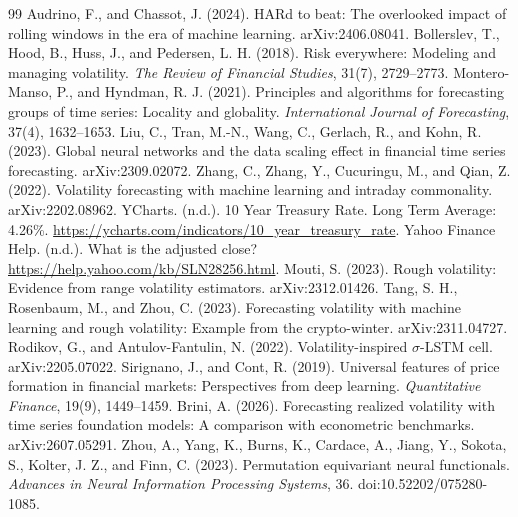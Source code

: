 \documentclass[12pt,a4paper]{article}
\numberwithin{equation}{section}
\numberwithin{table}{section}
\numberwithin{figure}{section}
\begin{document}
\begin{thebibliography}{99}
 Audrino, F., and Chassot, J. (2024). HARd to beat: The overlooked impact of rolling windows in the era of machine learning. arXiv:2406.08041.
 Bollerslev, T., Hood, B., Huss, J., and Pedersen, L. H. (2018). Risk everywhere: Modeling and managing volatility. \emph{The Review of Financial Studies}, 31(7), 2729--2773.
 Montero-Manso, P., and Hyndman, R. J. (2021). Principles and algorithms for forecasting groups of time series: Locality and globality. \emph{International Journal of Forecasting}, 37(4), 1632--1653.
 Liu, C., Tran, M.-N., Wang, C., Gerlach, R., and Kohn, R. (2023). Global neural networks and the data scaling effect in financial time series forecasting. arXiv:2309.02072.
 Zhang, C., Zhang, Y., Cucuringu, M., and Qian, Z. (2022). Volatility forecasting with machine learning and intraday commonality. arXiv:2202.08962.
 YCharts. (n.d.). 10 Year Treasury Rate. Long Term Average: 4.26\%. \url{https://ycharts.com/indicators/10_year_treasury_rate}.
 Yahoo Finance Help. (n.d.). What is the adjusted close? \url{https://help.yahoo.com/kb/SLN28256.html}.
 Mouti, S. (2023). Rough volatility: Evidence from range volatility estimators. arXiv:2312.01426.
 Tang, S. H., Rosenbaum, M., and Zhou, C. (2023). Forecasting volatility with machine learning and rough volatility: Example from the crypto-winter. arXiv:2311.04727.
 Rodikov, G., and Antulov-Fantulin, N. (2022). Volatility-inspired $\sigma$-LSTM cell. arXiv:2205.07022.
 Sirignano, J., and Cont, R. (2019). Universal features of price formation in financial markets: Perspectives from deep learning. \emph{Quantitative Finance}, 19(9), 1449--1459.
 Brini, A. (2026). Forecasting realized volatility with time series foundation models: A comparison with econometric benchmarks. arXiv:2607.05291.
 Zhou, A., Yang, K., Burns, K., Cardace, A., Jiang, Y., Sokota, S., Kolter, J. Z., and Finn, C. (2023). Permutation equivariant neural functionals. \emph{Advances in Neural Information Processing Systems}, 36. doi:10.52202/075280-1085.
\end{thebibliography}
\end{document}

